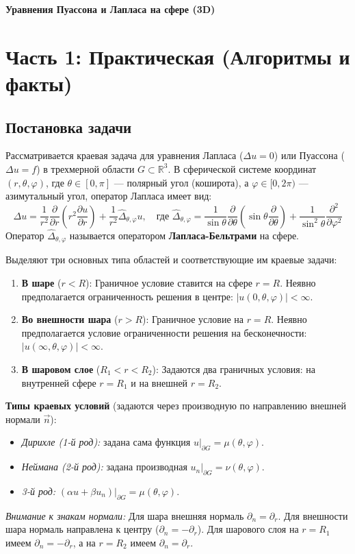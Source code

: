 \documentclass[a4paper,10pt]{article}
\begin{document}
\begin{center}
    \LARGE \textbf{Уравнения Пуассона и Лапласа на сфере (3D)}
\end{center}

\section{Часть 1: Практическая (Алгоритмы и факты)}

\subsection*{Постановка задачи}
Рассматривается краевая задача для уравнения Лапласа ($\Delta u = 0$) или Пуассона ($\Delta u = f$) в трехмерной области $G \subset \mathbb{R}^3$. В сферической системе координат $(r, \theta, \varphi)$, где $\theta \in [0, \pi]$ — полярный угол (коширота), а $\varphi \in[0, 2\pi)$ — азимутальный угол, оператор Лапласа имеет вид:
\[ \Delta u = \frac{1}{r^2}\frac{\partial}{\partial r}\left( r^2 \frac{\partial u}{\partial r} \right) + \frac{1}{r^2} \hat{\Delta}_{\theta,\varphi} u, \quad \text{где } \hat{\Delta}_{\theta,\varphi} = \frac{1}{\sin\theta}\frac{\partial}{\partial \theta}\left( \sin\theta \frac{\partial}{\partial \theta} \right) + \frac{1}{\sin^2\theta}\frac{\partial^2}{\partial \varphi^2} \]
Оператор $\hat{\Delta}_{\theta,\varphi}$ называется оператором \textbf{Лапласа-Бельтрами} на сфере.

Выделяют три основных типа областей и соответствующие им краевые задачи:
\begin{enumerate}
    \item \textbf{В шаре} ($r < R$): Граничное условие ставится на сфере $r=R$. Неявно предполагается ограниченность решения в центре: $|u(0, \theta, \varphi)| < \infty$.
    \item \textbf{Во внешности шара} ($r > R$): Граничное условие на $r=R$. Неявно предполагается условие ограниченности решения на бесконечности: $|u(\infty, \theta, \varphi)| < \infty$.
    \item \textbf{В шаровом слое} ($R_1 < r < R_2$): Задаются два граничных условия: на внутренней сфере $r=R_1$ и на внешней $r=R_2$.
\end{enumerate}

\textbf{Типы краевых условий} (задаются через производную по направлению внешней нормали $\vec{n}$):
\begin{itemize}
    \item \textit{Дирихле (1-й род):} задана сама функция $u|_{\partial G} = \mu(\theta, \varphi)$.
    \item \textit{Неймана (2-й род):} задана производная $u_n|_{\partial G} = \nu(\theta, \varphi)$.
    \item \textit{3-й род:} $(\alpha u + \beta u_n)|_{\partial G} = \mu(\theta, \varphi)$.
\end{itemize}
\textit{Внимание к знакам нормали:} Для шара внешняя нормаль $\partial_n = \partial_r$. Для внешности шара нормаль направлена к центру ($\partial_n = -\partial_r$). Для шарового слоя на $r=R_1$ имеем $\partial_n = -\partial_r$, а на $r=R_2$ имеем $\partial_n = \partial_r$.
\end{document}
